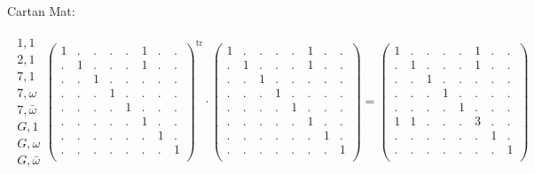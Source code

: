 \documentclass[12pt,a4paper]{amsart}
\begin{document}
\newpage
\normalsize {}
Cartan Mat:

\begin{align*}
  \begin{array}{r}
    1,1 \\
    2,1 \\
    7,1 \\
    7,\omega \\
    7,\bar{\omega} \\
    G,1 \\
    G,\omega \\
    G,\bar\omega
  \end{array}
  \left(
  \begin{array}{c|c|ccc|ccc}
    1&.&.&.&.&1&.&.\\\hline
    .&1&.&.&.&1&.&.\\\hline
    .&.&1&.&.&.&.&.\\
    .&.&.&1&.&.&.&.\\
    .&.&.&.&1&.&.&.\\\hline
    .&.&.&.&.&1&.&.\\
    .&.&.&.&.&.&1&.\\
    .&.&.&.&.&.&.&1\\
  \end{array}
\right)^{\mathrm{tr}}
\cdot
  \left(
  \begin{array}{c|c|ccc|ccc}
    1&.&.&.&.&1&.&.\\\hline
    .&1&.&.&.&1&.&.\\\hline
    .&.&1&.&.&.&.&.\\
    .&.&.&1&.&.&.&.\\
    .&.&.&.&1&.&.&.\\\hline
    .&.&.&.&.&1&.&.\\
    .&.&.&.&.&.&1&.\\
    .&.&.&.&.&.&.&1\\
  \end{array}
\right)
=
  \left(
  \begin{array}{c|c|ccc|ccc}
    1&.&.&.&.&1&.&.\\\hline
    .&1&.&.&.&1&.&.\\\hline
    .&.&1&.&.&.&.&.\\
    .&.&.&1&.&.&.&.\\
    .&.&.&.&1&.&.&.\\\hline
    1&1&.&.&.&3&.&.\\
    .&.&.&.&.&.&1&.\\
    .&.&.&.&.&.&.&1\\
  \end{array}
\right)
\end{align*}
\end{document}
